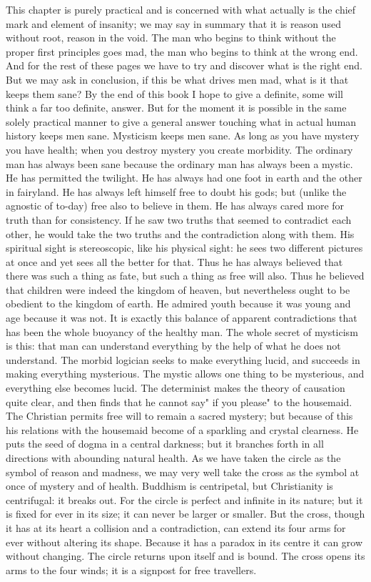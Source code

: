 \documentclass{book}
\begin{document}
This chapter is purely practical and is concerned with what actually is the chief mark and element of insanity; we may say in summary that it is reason used without root, reason in the void. The man who begins to think without the proper first principles goes mad, the man who begins to think at the wrong end. And for the rest of these pages we have to try and discover what is the right end. But we may ask in conclusion, if this be what drives men mad, what is it that keeps them sane? By the end of this book I hope to give a definite, some will think a far too definite, answer. But for the moment it is possible in the same solely practical manner to give a general answer touching what in actual human history keeps men sane. Mysticism keeps men sane. As long as you have mystery you have health; when you destroy mystery you create morbidity. The ordinary man has always been sane because the ordinary man has always been a mystic. He has permitted the twilight. He has always had one foot in earth and the other in fairyland. He has always left himself free to doubt his gods; but (unlike the agnostic of to-day) free also to believe in them. He has always cared more for truth than for consistency. If he saw two truths that seemed to contradict each other, he would take the two truths and the contradiction along with them. His spiritual sight is stereoscopic, like his physical sight: he sees two different pictures at once and yet sees all the better for that. Thus he has always believed that there was such a thing as fate, but such a thing as free will also. Thus he believed that children were indeed the kingdom of heaven, but nevertheless ought to be obedient to the kingdom of earth. He admired youth because it was young and age because it was not. It is exactly this balance of apparent contradictions that has been the whole buoyancy of the healthy man. The whole secret of mysticism is this: that man can understand everything by the help of what he does not understand. The morbid logician seeks to make everything lucid, and succeeds in making everything mysterious. The mystic allows one thing to be mysterious, and everything else becomes lucid. The determinist makes the theory of causation quite clear, and then finds that he cannot say" if you please" to the housemaid. The Christian permits free will to remain a sacred mystery; but because of this his relations with the housemaid become of a sparkling and crystal clearness. He puts the seed of dogma in a central darkness; but it branches forth in all directions with abounding natural health. As we have taken the circle as the symbol of reason and madness, we may very well take the cross as the symbol at once of mystery and of health. Buddhism is centripetal, but Christianity is centrifugal: it breaks out. For the circle is perfect and infinite in its nature; but it is fixed for ever in its size; it can never be larger or smaller. But the cross, though it has at its heart a collision and a contradiction, can extend its four arms for ever without altering its shape. Because it has a paradox in its centre it can grow without changing. The circle returns upon itself and is bound. The cross opens its arms to the four winds; it is a signpost for free travellers.
\end{document}

